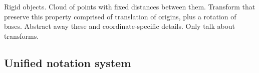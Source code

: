 
%





Rigid objects. Cloud of points with fixed distances between them. Transform that preserve this property comprised of translation of origins, plus a rotation of bases. Abstract away these and coordinate-specific details. Only talk about transforms.



\subsection{Unified notation system}

%
%



